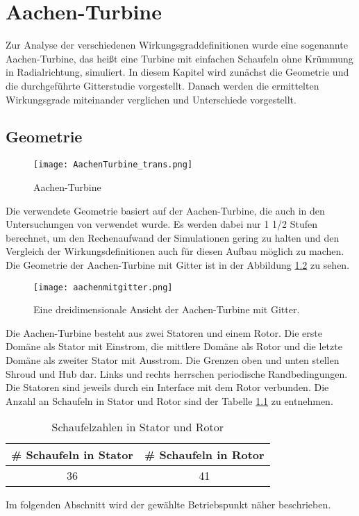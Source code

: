 \chapter{Aachen-Turbine}
\label{cha:aachen}
Zur Analyse der verschiedenen Wirkungsgraddefinitionen wurde eine sogenannte Aachen-Turbine, das heißt eine Turbine mit einfachen Schaufeln ohne Krümmung in Radialrichtung, simuliert. In diesem Kapitel wird zunächst die Geometrie und die durchgeführte Gitterstudie vorgestellt. Danach werden die ermittelten Wirkungsgrade miteinander verglichen und Unterschiede vorgestellt.
\section{Geometrie}
\label{sec:aachengeo}
  \begin{figure}[htbp]
	\centering
	\label{fig:imgAachenTurbine}
	\texttt{[image: AachenTurbine\_trans.png]}
	\caption{Aachen-Turbine}
\end{figure} 
Die verwendete Geometrie basiert auf der Aachen-Turbine, die auch in den Untersuchungen von \cite{ufi2001YaoDavis} 
verwendet wurde. Es werden dabei nur 1 1/2 Stufen berechnet, um den Rechenaufwand der Simulationen gering zu halten und den Vergleich der Wirkungsdefinitionen auch für diesen Aufbau möglich zu machen. Die Geometrie der Aachen-Turbine mit Gitter ist in der Abbildung \ref{fig:aachengebiet} zu sehen. 
\begin{figure}[htbp]
	\centering
	\texttt{[image: aachenmitgitter.png]}
	\caption{Eine dreidimensionale Ansicht der Aachen-Turbine mit Gitter.}
	\label{fig:aachengebiet}
\end{figure}
Die Aachen-Turbine besteht aus zwei Statoren und einem Rotor. Die erste Domäne als Stator mit Einstrom, die mittlere Domäne als Rotor und die letzte Domäne als zweiter Stator mit Ausstrom. Die Grenzen oben und unten stellen Shroud und Hub dar. Links und rechts herrschen periodische Randbedingungen. Die Statoren sind jeweils durch ein Interface mit dem Rotor verbunden. Die Anzahl an Schaufeln in Stator und Rotor sind der Tabelle \ref{tab:aachenabmessungen} zu entnehmen.\newline
\begin{table}[htbp]
\centering
\label{tab:aachenabmessungen}
\caption{Schaufelzahlen in Stator und Rotor}
\begin{tabular}{ c| c}
\# Schaufeln in Stator&\# Schaufeln in Rotor\\
\hline
36&41\\
\end{tabular}
\end{table}
Im folgenden Abschnitt wird der gewählte Betriebspunkt näher beschrieben.
